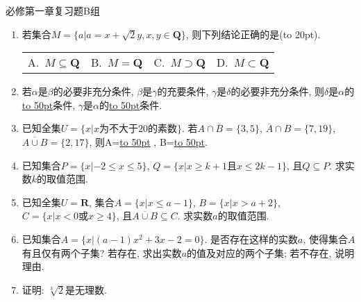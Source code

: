 \documentclass[10pt,a4paper]{article}
\newcommand{\blank}[1]{\underline{\hbox to #1pt{}}}
\newcommand{\bracket}[1]{(\hbox to #1pt{})}
\newcommand{\fourch}[4]{\par\begin{tabular}{p{.23\textwidth}p{.23\textwidth}p{.23\textwidth}p{.23\textwidth}}
A.~#1 &B.~#2& C.~#3& D.~#4
\end{tabular}}
\begin{document}
必修第一章复习题B组
\begin{enumerate}[1.]

\item 若集合$M=\{a|a=x+\sqrt2y, x,y\in \mathbf{Q}\}$, 则下列结论正确的是\bracket{20}.
\fourch{$M\subseteq \mathbf{Q}$}{$M=\mathbf{Q}$}{$M\supset \mathbf{Q}$}{$M\subset \mathbf{Q}$}
\vspace*{3cm}
\item 若$\alpha$是$\beta$的必要非充分条件, $\beta$是$\gamma$的充要条件, $\gamma$是$\delta$的必要非充分条件, 则$\delta$是$\alpha$的\blank{50}条件, $\gamma$是$\alpha$的\blank{50}条件.
\vspace*{3cm}
\item 已知全集$U=\{x|x\text{为不大于}20\text{的素数}\}$. 若$A\cap \overline{B}=\{3, 5\}$, $\overline{A}\cap B=\{7, 19\}$, $\overline{A\cup B}=\{2, 17\}$, 则A=\blank{50} , B=\blank{50}.
\vspace*{3cm}
\item 已知集合$P=\{x|-2\le x\le 5\}$, $Q=\{x|x\ge k+1\text{且}x\le 2k-1\}$, 且$Q\subseteq P$. 求实数$k$的取值范围.
\vspace*{3cm}
\item 已知全集$U=\mathbf{R}$, 集合$A=\{x|x\le a-1\}$, $B=\{x|x>a+2\}$, $C=\{x|x<0\text{或}x\ge 4\}$, 且$\overline{A\cup B}\subseteq C$. 求实数$a$的取值范围.
\vspace*{3cm}
\item 已知集合$A=\{x|(a-1)x^2+3x-2=0\}$. 是否存在这样的实数$a$, 使得集合$A$有且仅有两个子集? 若存在, 求出实数$a$的值及对应的两个子集; 若不存在, 说明理由.
\vspace*{3cm}
\item 证明: $\sqrt[3]{2}$是无理数. 
\vspace*{3cm}
\end{enumerate}
\end{document}
